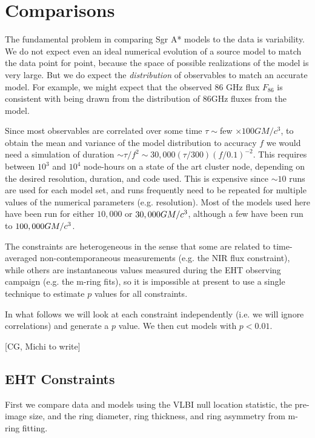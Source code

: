 \section{Comparisons}\label{sec:comparisons}

The fundamental problem in comparing Sgr A* models to the data is variability.  We do not expect even an ideal numerical evolution of a source model to match the data point for point, because the space of possible realizations of the model is very large.  But we do expect the {\em distribution} of observables to match an accurate model.  For example, we might expect that the observed 86 GHz flux $F_{86}$ is consistent with being drawn from the distribution of 86GHz fluxes from the model.

Since most observables are correlated over some time $\tau \sim $few $\times 100 G M/c^3$, to obtain the mean and variance of the model distribution to accuracy $f$ we would need a simulation of duration $\sim \tau/f^2 \sim 30,000 (\tau/300) (f/0.1)^{-2}$.  This requires between $10^3$ and $10^4$ node-hours on a state of the art cluster node, depending on the desired resolution, duration, and code used.  This is expensive since $\sim 10$ runs are used for each model set, and runs frequently need to be repeated for multiple values of the numerical parameters (e.g. resolution).  Most of the models used here have been run for either $10,000$ or $30,000 G M/c^3$, although a few have been run to $100,000 G M/c^3$.

The constraints are heterogeneous in the sense that some are related to time-averaged non-contemporaneous measurements (e.g. the NIR flux constraint), while others are instantaneous values measured during the EHT observing campaign (e.g. the m-ring fits), so it is impossible at present to use a single technique to estimate $p$ values for all constraints.

In what follows we will look at each constraint independently (i.e. we will ignore correlations) and generate a $p$ value.  We then cut models with $p < 0.01$.

[CG, Michi to write]

\subsection{EHT Constraints}

First we compare data and models using the VLBI null location statistic, the pre-image size, and the ring diameter, ring thickness, and ring asymmetry from m-ring fitting.

